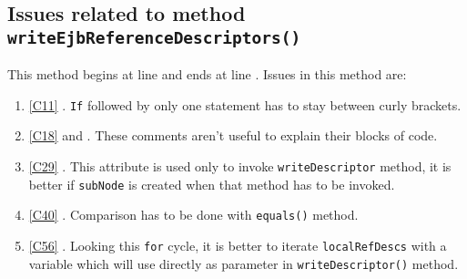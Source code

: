 \subsection{Issues related to method \texttt{writeEjbReferenceDescriptors()}}
This method begins at line  and ends at line \codeline{}. Issues in this method are:
\begin{enumerate}
\item \ref{C11} . \texttt{If} followed by only one statement has to stay between curly brackets.
\item \ref{C18}  and . These comments aren't useful to explain their blocks of code.
\item \ref{C29} . This attribute is used only to invoke \texttt{writeDescriptor} method, it is better if \texttt{subNode} is created when that method has to be invoked.
\item \ref{C40} . Comparison has to be done with \texttt{equals()} method.
\item \ref{C56} . Looking this \texttt{for} cycle, it is better to iterate \texttt{localRefDescs} with a variable which will use directly as parameter in \texttt{writeDescriptor()} method.   
\end{enumerate}